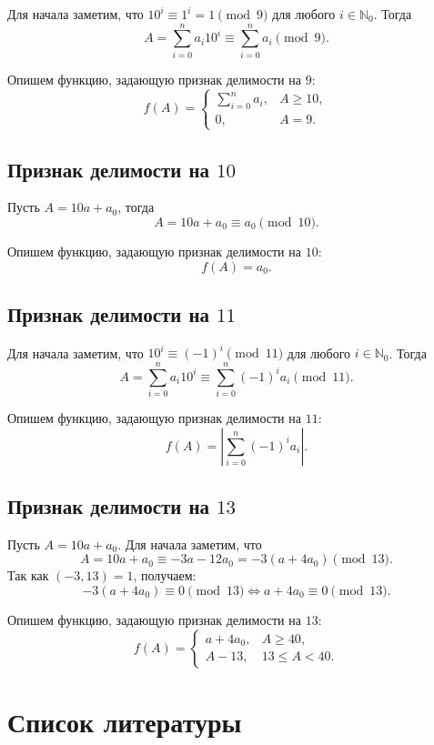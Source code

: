 \documentclass[14pt, a4paper]{extarticle}
\theoremstyle{definition}
\begin{document}
	Для начала заметим, что $10^i\equiv1^i=1\pmod9$ для любого $i\in\mathbb{N}_0$. Тогда
	$$A=\sum_{i=0}^na_i10^i\equiv\sum_{i=0}^na_i\pmod9.$$
	
	Опишем функцию, задающую признак делимости на $9$:
	$$f(A)=\begin{cases}
		\sum_{i=0}^na_i,&A\geqslant10,\\
		0,&A=9.
	\end{cases}$$

\subsection{Признак делимости на $10$}
	
	Пусть $A=10a+a_0$, тогда
	$$A=10a+a_0\equiv a_0\pmod{10}.$$
	
	Опишем функцию, задающую признак делимости на $10$:
	$$f(A)=a_0.$$

\subsection{Признак делимости на $11$}
	
	Для начала заметим, что $10^i\equiv(-1)^i\pmod11$ для любого $i\in\mathbb{N}_0$. Тогда
	$$A=\sum_{i=0}^na_i10^i\equiv\sum_{i=0}^n(-1)^ia_i\pmod{11}.$$
	
	Опишем функцию, задающую признак делимости на $11$:
	$$f(A)=\left|\sum_{i=0}^n(-1)^ia_i\right|.$$

\subsection{Признак делимости на $13$}
	
	Пусть $A=10a+a_0$. Для начала заметим, что
	$$A=10a+a_0\equiv-3a-12a_0=-3(a+4a_0)\pmod{13}.$$
	Так как $(-3,13)=1$, получаем:
	$$\boxed{-3(a+4a_0)\equiv0\pmod{13}\Leftrightarrow a+4a_0\equiv0\pmod{13}}.$$
	
	Опишем функцию, задающую признак делимости на $13$:
	$$f(A)=\begin{cases}
		a+4a_0,&A\geqslant40,\\
		A-13,&13\leqslant A<40.
	\end{cases}$$
\newpage
\section{Список литературы}
\end{document}
